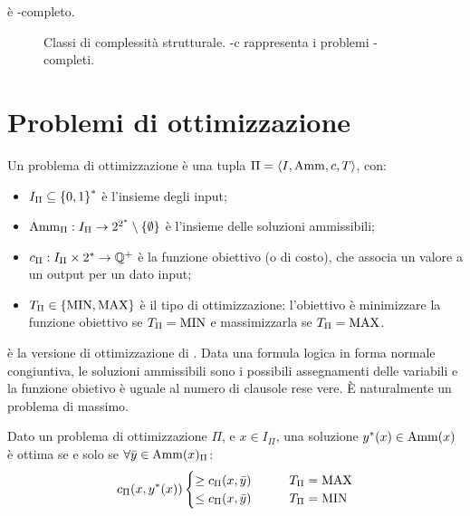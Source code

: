 \begin{theorem}
	\Sat è \NP-completo.
\end{theorem}

\begin{figure}
	\centering
	
	\caption{Classi di complessità strutturale. \NP-c rappresenta i problemi \NP-completi.}
	\label{fig:structcomplclass}
\end{figure}



\section{Problemi di ottimizzazione}

\begin{defin}
	Un problema di ottimizzazione è una tupla $\Pi=\langle I,\mathrm{Amm},c,T \rangle$, con:
	\begin{itemize}
		\item $I_\Pi\subseteq\left\{ 0,1 \right\}^*$ è l'insieme degli input;
		\item $\mathrm{Amm}_\Pi: I_\Pi\to2^{2^*}\setminus\left\{ \emptyset \right\}$ è l'insieme delle soluzioni ammissibili;
		\item $c_\Pi:I_\Pi\times 2^*\to\mathbb Q^+$ è la funzione obiettivo (o di costo), che associa un valore a un output per un dato input;
		\item $T_\Pi \in\left\{ \mathrm{MIN},\mathrm{MAX} \right\}$ è il tipo di ottimizzazione: l'obiettivo è minimizzare la funzione obiettivo se $T_\Pi=\mathrm{MIN}$ e massimizzarla se $T_\Pi=\mathrm{MAX}$.
	\end{itemize}
\end{defin}

\begin{examp}
	\MaxSat è la versione di ottimizzazione di \Sat. Data una formula logica in forma normale congiuntiva, le soluzioni ammissibili sono i possibili assegnamenti delle variabili e la funzione obietivo è uguale al numero di clausole rese vere. È naturalmente un problema di massimo.
\end{examp}

\begin{defin}
	Dato un problema di ottimizzazione $\Pi$, e $x\in I_\Pi$, una soluzione $y^*(x)\in\mathrm{Amm}(x)$ è ottima se e solo se $\forall \bar y\in\mathrm{Amm}(x)_\Pi$:
	\begin{equation*}
		c_\Pi(x,y^*(x))
		\begin{cases}
			\geq c_\Pi(x,\bar y) \qquad & T_\Pi=\mathrm{MAX} \\
			\leq c_\Pi(x,\bar y) \qquad & T_\Pi=\mathrm{MIN}
		\end{cases}
	\end{equation*}
\end{defin}

